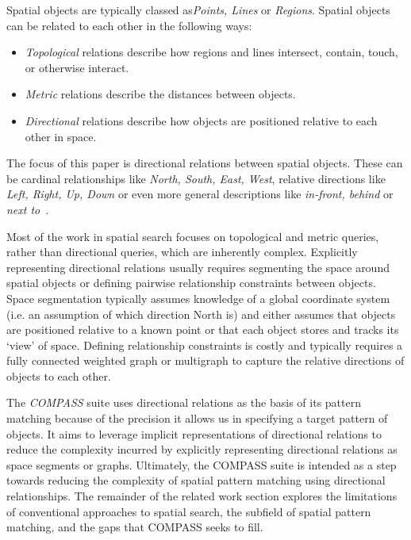 \par{
    Spatial objects are typically classed as\textit{Points, Lines} or \textit{Regions}. 
    Spatial objects can be related to each other in the following ways:
    \begin{itemize}
        \item \textit{Topological} relations describe how regions and lines intersect, contain, touch, or otherwise interact.
        \item \textit{Metric} relations describe the distances between objects. 
        \item \textit{Directional} relations describe how objects are positioned relative to each other in space.
    \end{itemize}

    The focus of this paper is directional relations between spatial objects. These can be cardinal relationships like \textit{North, South, East, West}, relative directions like \textit{Left, Right, Up, Down} or even more general descriptions like \textit{in-front, behind} or \textit{next to}~\cite{Carniel2020,Bertella2022,Carniel2023}.
}
\par{Most of the work in spatial search focuses on topological and metric queries, rather than directional queries, which are inherently complex.
    Explicitly representing directional relations usually requires segmenting the space around spatial objects or defining pairwise relationship constraints between objects. 
    Space segmentation typically assumes knowledge of a global coordinate system (i.e. an assumption of which direction North is) and either assumes that objects are positioned relative to a known point or that each object stores and tracks its `view' of space.  
    Defining relationship constraints is costly and typically requires a fully connected weighted graph or multigraph to capture the relative directions of objects to each other.
}
\par{
    The \emph{COMPASS} suite uses directional relations as the basis of its pattern matching because of the precision it allows us in specifying a target pattern of objects.
    It aims to leverage implicit representations of directional relations to reduce the complexity incurred by explicitly representing directional relations as space segments or graphs. 
    Ultimately, the COMPASS suite is intended as a step towards reducing the complexity of spatial pattern matching using directional relationships.
    The remainder of the related work section explores the limitations of conventional approaches to spatial search, the subfield of spatial pattern matching, and the gaps that COMPASS seeks to fill.
}



